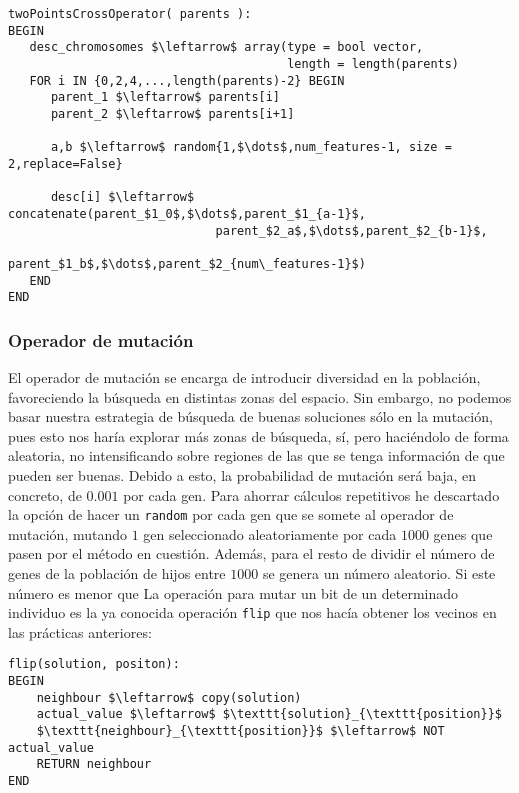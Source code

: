 \documentclass[11pt,leqno]{article}
\begin{document}
\begin{lstlisting}[mathescape=true]
twoPointsCrossOperator( parents ):
BEGIN
   desc_chromosomes $\leftarrow$ array(type = bool vector,
                                       length = length(parents)
   FOR i IN {0,2,4,...,length(parents)-2} BEGIN
      parent_1 $\leftarrow$ parents[i]
      parent_2 $\leftarrow$ parents[i+1]
      
      a,b $\leftarrow$ random{1,$\dots$,num_features-1, size = 2,replace=False}
      
      desc[i] $\leftarrow$ concatenate(parent_$1_0$,$\dots$,parent_$1_{a-1}$,
                             parent_$2_a$,$\dots$,parent_$2_{b-1}$,
                             parent_$1_b$,$\dots$,parent_$2_{num\_features-1}$)
   END
END

\end{lstlisting}
	
	
\subsubsection{Operador de mutación}

	El operador de mutación se encarga de introducir diversidad en la población, favoreciendo la búsqueda en distintas zonas del espacio. Sin embargo, no podemos basar nuestra estrategia de búsqueda de buenas soluciones sólo en la mutación, pues esto nos haría explorar más zonas de búsqueda, sí, pero haciéndolo de forma aleatoria, no intensificando sobre regiones de las que se tenga información de que pueden ser buenas. Debido a esto, la probabilidad de mutación será baja, en concreto, de $0.001$ por cada gen. Para ahorrar cálculos repetitivos he descartado la opción de hacer un \texttt{random} por cada gen que se somete al operador de mutación, mutando $1$ gen seleccionado aleatoriamente por cada $1000$ genes que pasen por el método en cuestión. Además, para el resto de dividir el número de genes de la población de hijos entre $1000$ se genera un número aleatorio. Si este número es menor que 
	La operación para mutar un bit de un determinado individuo es la ya conocida operación \texttt{flip} que nos hacía obtener los vecinos en las prácticas anteriores:
	
\begin{lstlisting}[mathescape=true]
flip(solution, positon):
BEGIN
	neighbour $\leftarrow$ copy(solution)
	actual_value $\leftarrow$ $\texttt{solution}_{\texttt{position}}$
	$\texttt{neighbour}_{\texttt{position}}$ $\leftarrow$ NOT actual_value
	RETURN neighbour
END
\end{lstlisting}
\end{document}
